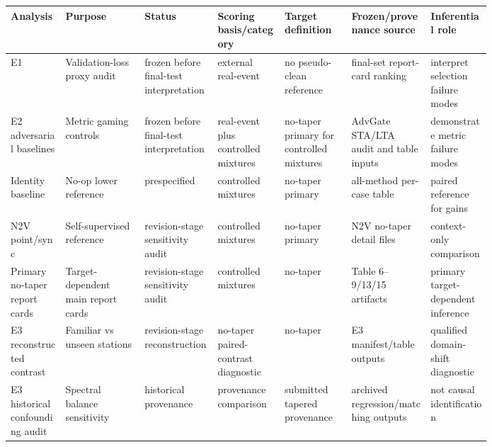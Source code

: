 \begin{tabular}{@{}p{0.09\linewidth}p{0.13\linewidth}p{0.12\linewidth}p{0.11\linewidth}p{0.11\linewidth}p{0.13\linewidth}p{0.10\linewidth}@{}}
\toprule
Analysis & Purpose & Status & Scoring basis/category & Target definition & Frozen/provenance source & Inferential role \\
\midrule
E1 & Validation-loss proxy audit & frozen before final-test interpretation & external real-event & no pseudo-clean reference & final-set report-card ranking & interpret selection failure modes \\
E2 adversarial baselines & Metric gaming controls & frozen before final-test interpretation & real-event plus controlled mixtures & no-taper primary for controlled mixtures & AdvGate STA/LTA audit and table inputs & demonstrate metric failure modes \\
Identity baseline & No-op lower reference & prespecified & controlled mixtures & no-taper primary & all-method per-case table & paired reference for gains \\
N2V point/sync & Self-supervised reference & revision-stage sensitivity audit & controlled mixtures & no-taper primary & N2V no-taper detail files & context-only comparison \\
Primary no-taper report cards & Target-dependent main report cards & revision-stage sensitivity audit & controlled mixtures & no-taper & Table 6--9/13/15 artifacts & primary target-dependent inference \\
E3 reconstructed contrast & Familiar vs unseen stations & revision-stage reconstruction & no-taper paired-contrast diagnostic & no-taper & E3 manifest/table outputs & qualified domain-shift diagnostic \\
E3 historical confounding audit & Spectral balance sensitivity & historical provenance & provenance comparison & submitted tapered provenance & archived regression/matching outputs & not causal identification \\
\bottomrule
\end{tabular}

